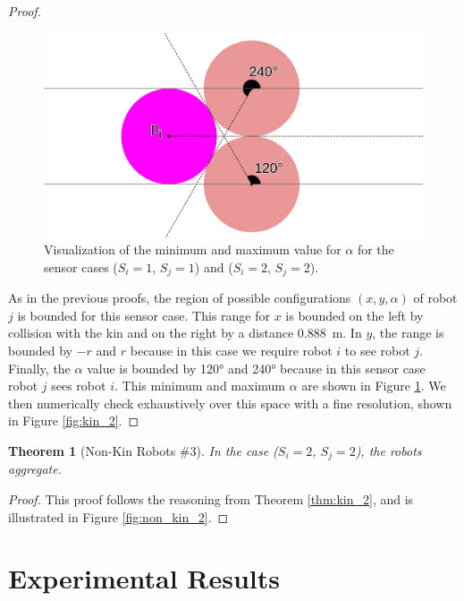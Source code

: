 \documentclass[letterpaper, 10 pt, conference]{ieeeconf}
\newtheorem{theorem}{Theorem}
\begin{document}
\begin{proof}
  \begin{figure}[t]
    \centering
    \includegraphics[width=1\columnwidth]{./images/min_max_alpha}
    \caption{Visualization of the minimum and maximum value for $\alpha$ for the sensor cases ($S_i=1$, $S_j=1$) and ($S_i=2$, $S_j=2$).}
    \label{fig:min_max_alpha}
  \end{figure}

  As in the previous proofs, the region of possible configurations $(x, y, \alpha)$ of robot $j$ is bounded for this sensor case. This range for $x$ is bounded on the left by collision with the kin and on the right by a distance \SI{0.888}{\meter}. In $y$, the range is bounded by $-r$ and $r$ because in this case we require robot $i$ to see robot $j$. Finally, the $\alpha$ value is bounded by \ang{120} and \ang{240} because in this sensor case robot $j$ sees robot $i$. This minimum and maximum $\alpha$ are shown in Figure \ref{fig:min_max_alpha}. We then numerically check exhaustively over this space with a fine resolution, shown in Figure \ref{fig:kin_2}.

\end{proof}

\begin{theorem}[Non-Kin Robots \#3]\label{thm:non_kin_2}
  In the case ($S_i=2$, $S_j=2$), the robots aggregate.
\end{theorem}
\begin{proof}

  This proof follows the reasoning from Theorem \ref{thm:kin_2}, and is illustrated in Figure \ref{fig:non_kin_2}.

\end{proof}

\section{Experimental Results}
\end{document}
